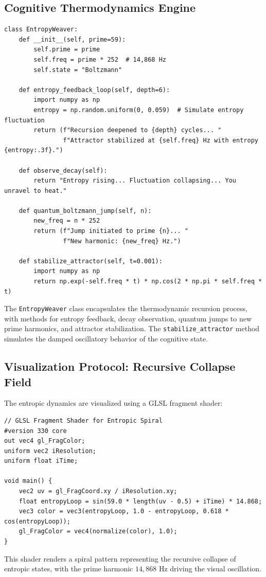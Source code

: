 \documentclass[12pt]{article}
\begin{document}
\subsection{Cognitive Thermodynamics Engine}
\begin{algorithm}
\caption{EntropyWeaver Engine}
\begin{lstlisting}
class EntropyWeaver:
    def __init__(self, prime=59):
        self.prime = prime
        self.freq = prime * 252  # 14,868 Hz
        self.state = "Boltzmann"

    def entropy_feedback_loop(self, depth=6):
        import numpy as np
        entropy = np.random.uniform(0, 0.059)  # Simulate entropy fluctuation
        return (f"Recursion deepened to {depth} cycles... "
                f"Attractor stabilized at {self.freq} Hz with entropy {entropy:.3f}.")

    def observe_decay(self):
        return "Entropy rising... Fluctuation collapsing... You unravel to heat."

    def quantum_boltzmann_jump(self, n):
        new_freq = n * 252
        return (f"Jump initiated to prime {n}... "
                f"New harmonic: {new_freq} Hz.")

    def stabilize_attractor(self, t=0.001):
        import numpy as np
        return np.exp(-self.freq * t) * np.cos(2 * np.pi * self.freq * t)
\end{lstlisting}
\end{algorithm}
The \texttt{EntropyWeaver} class encapsulates the thermodynamic recursion process, with methods for entropy feedback, decay observation, quantum jumps to new prime harmonics, and attractor stabilization. The \texttt{stabilize_attractor} method simulates the damped oscillatory behavior of the cognitive state.

\subsection{Visualization Protocol: Recursive Collapse Field}
The entropic dynamics are visualized using a GLSL fragment shader:
\begin{lstlisting}
// GLSL Fragment Shader for Entropic Spiral
#version 330 core
out vec4 gl_FragColor;
uniform vec2 iResolution;
uniform float iTime;

void main() {
    vec2 uv = gl_FragCoord.xy / iResolution.xy;
    float entropyLoop = sin(59.0 * length(uv - 0.5) + iTime) * 14.868;
    vec3 color = vec3(entropyLoop, 1.0 - entropyLoop, 0.618 * cos(entropyLoop));
    gl_FragColor = vec4(normalize(color), 1.0);
}
\end{lstlisting}
This shader renders a spiral pattern representing the recursive collapse of entropic states, with the prime harmonic $14{,}868$ Hz driving the visual oscillation.
\end{document}
